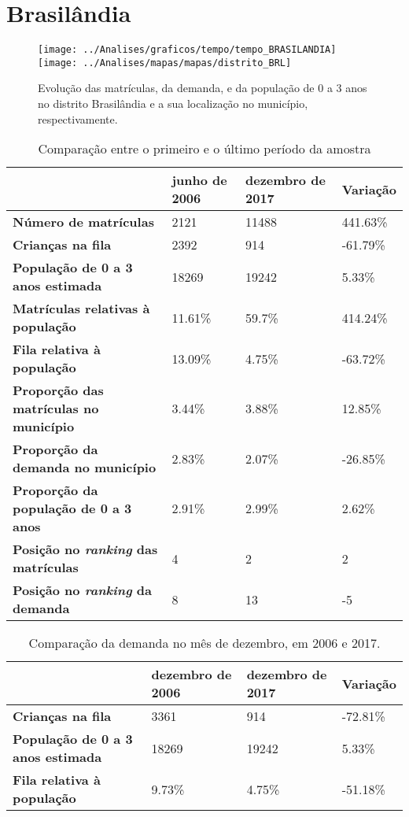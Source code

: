 \section{Brasilândia}
\begin{figure}[H]
	\centering
	\texttt{[image: ../Analises/graficos/tempo/tempo\_BRASILANDIA]}
	\texttt{[image: ../Analises/mapas/mapas/distrito\_BRL]}
	\caption{Evolução das matrículas, da demanda, e da população de 0 a 3 anos no distrito Brasilândia e a sua localização no município, respectivamente.}
\end{figure}
\begin{table}[H]
	\begin{tabular}{|l|l|l|l|}
		\hline
		\textbf{}                                      & \textbf{junho de 2006}       & \textbf{dezembro de 2017}    & \textbf{Variação} \\ \hline
		\textbf{Número de matrículas}                  & 2121 & 11488 & 441.63\% \\ \hline
		\textbf{Crianças na fila}                      & 2392 & 914 & -61.79\% \\ \hline
		\textbf{População de 0 a 3 anos estimada}      & 18269 & 19242 & 5.33\% \\ \hline
		\textbf{Matrículas relativas à população}      & 11.61\% & 59.7\% & 414.24\% \\ \hline
		\textbf{Fila relativa à população}             & 13.09\% & 4.75\% & -63.72\% \\ \hline
		\textbf{Proporção das matrículas no município} & 3.44\% & 3.88\% & 12.85\% \\ \hline
		\textbf{Proporção da demanda no município}     & 2.83\% & 2.07\% & -26.85\% \\ \hline
		\textbf{Proporção da população de 0 a 3 anos}  & 2.91\% & 2.99\% & 2.62\% \\ \hline
		\textbf{Posição no \textit{ranking} das matrículas}     & 4 & 2 & 2 \\ \hline
		\textbf{Posição no \textit{ranking} da demanda}         & 8 & 13 & -5 \\ \hline
	\end{tabular}
	\caption{Comparação entre o primeiro e o último período da amostra}
\end{table}
\begin{table}[H]
	\begin{tabular}{|l|l|l|l|}
		\hline
		\textbf{}                                 & \textbf{dezembro de 2006} & \textbf{dezembro de 2017} & \textbf{Variação} \\ \hline
		\textbf{Crianças na fila}                      & 3361 & 914 & -72.81\% \\ \hline
		\textbf{População de 0 a 3 anos estimada}      & 18269 & 19242 & 5.33\% \\ \hline
		\textbf{Fila relativa à população}             & 9.73\% & 4.75\% & -51.18\% \\ \hline
	\end{tabular}
	\caption{Comparação da demanda no mês de dezembro, em 2006 e 2017.}
\end{table}
